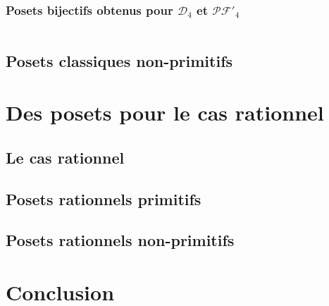 \documentclass{beamer}
\begin{document}
\begin{frame}
    \frametitle{Posets \textbf{bijectifs} obtenus pour $\mathcal{D}_4$ et
        $\mathcal{PF'}_4$}
    \begin{columns}
        \begin{column}{0.4\textwidth}
            \begin{center}
                
            \end{center}
        \end{column}
        \begin{column}{0.6\textwidth}
            \begin{center}
                
            \end{center}
        \end{column}
    \end{columns}
\end{frame}

\subsection{Posets classiques non-primitifs}

\section{Des posets pour le cas rationnel}

\subsection{Le cas rationnel}

\subsection{Posets rationnels primitifs}

\subsection{Posets rationnels non-primitifs}

\section{Conclusion}
\end{document}
